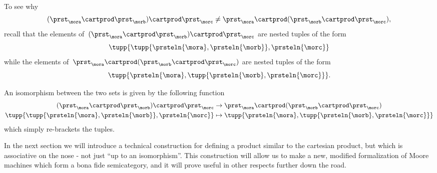 To see why
\begin{equation}
    \label{eq:assoc-fails1}
    (\prst_{\mora} \cartprod \prst_{\morb}) \cartprod \prst_{\morc} \neq \prst_{\mora} \cartprod (\prst_{\morb} \cartprod \prst_{\morc}),
\end{equation}
recall that the elements of~$(\prst_{\mora} \cartprod \prst_{\morb}) \cartprod \prst_{\morc}$ are nested tuples of the form
\begin{equation}
    \tupp{ \tupp{\prsteln{\mora}, \prsteln{\morb}}, \prsteln{\morc} }
\end{equation}
while the elements of~$\prst_{\mora} \cartprod (\prst_{\morb} \cartprod \prst_{\morc})$ are nested tuples of the form
\begin{equation}
    \tupp{\prsteln{\mora}, \tupp{\prsteln{\morb}, \prsteln{\morc}} }.
\end{equation}

An isomorphism between the two sets is given by the following function
\begin{equation}
    \label{eq:assoc-fails2}
    \begin{aligned}
        (\prst_{\mora} \cartprod \prst_{\morb})
        \cartprod \prst_{\morc}                                           & \to \prst_{\mora} \cartprod (\prst_{\morb} \cartprod \prst_{\morc}) \\
        \tupp{ \tupp{\prsteln{\mora}, \prsteln{\morb}}, \prsteln{\morc} } & \mapsto \tupp{\prsteln{\mora}, \tupp{\prsteln{\morb}, \prsteln{\morc}} }
    \end{aligned}
\end{equation}
which simply re-brackets the tuples.

In the next section we will introduce a technical construction for defining a product similar to the cartesian product, but which is associative on the nose - not just ``up to an isomorphism''.
This construction will allow us to make a new, modified formalization of Moore machines which form a bona fide semicategory, and it will prove useful in other respects further down the road.
